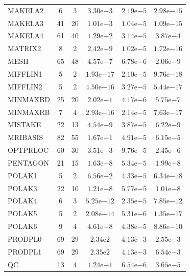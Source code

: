 \documentclass[11pt]{article}
\begin{document}
\begin{center}
\begin{longtable}{lccccc}
MAKELA2 & 6 & 3 & $3.30\mathrm{e}{-3}$ & $2.19\mathrm{e}{-5}$ & $2.98\mathrm{e}{-15}$ \\
MAKELA3 & 41 & 20 & $1.01\mathrm{e}{-3}$ & $1.04\mathrm{e}{-5}$ & $1.09\mathrm{e}{-15}$ \\
MAKELA4 & 61 & 40 & $1.29\mathrm{e}{-2}$ & $3.14\mathrm{e}{-5}$ & $3.87\mathrm{e}{-4}$ \\
MATRIX2 & 8 & 2 & $2.42\mathrm{e}{-9}$ & $1.02\mathrm{e}{-5}$ & $1.72\mathrm{e}{-16}$ \\
MESH & 65 & 48 & $4.57\mathrm{e}{-7}$ & $6.78\mathrm{e}{-6}$ & $2.06\mathrm{e}{-9}$ \\
MIFFLIN1 & 5 & 2 & $1.93\mathrm{e}{-17}$ & $2.10\mathrm{e}{-5}$ & $9.76\mathrm{e}{-18}$ \\
MIFFLIN2 & 5 & 2 & $4.50\mathrm{e}{-16}$ & $3.27\mathrm{e}{-5}$ & $5.44\mathrm{e}{-17}$ \\
MINMAXBD & 25 & 20 & $2.02\mathrm{e}{-1}$ & $4.17\mathrm{e}{-6}$ & $5.75\mathrm{e}{-7}$ \\
MINMAXRB & 7 & 4 & $2.93\mathrm{e}{-16}$ & $2.14\mathrm{e}{-5}$ & $7.63\mathrm{e}{-17}$ \\
MISTAKE & 22 & 13 & $4.54\mathrm{e}{-9}$ & $3.87\mathrm{e}{-5}$ & $6.22\mathrm{e}{-9}$ \\
MRIBASIS & 82 & 55 & $1.67\mathrm{e}{-1}$ & $4.91\mathrm{e}{-5}$ & $6.15\mathrm{e}{-5}$ \\
OPTPRLOC & 60 & 30 & $3.51\mathrm{e}{-3}$ & $9.76\mathrm{e}{-5}$ & $2.45\mathrm{e}{-6}$ \\
PENTAGON & 21 & 15 & $1.63\mathrm{e}{-8}$ & $5.34\mathrm{e}{-5}$ & $1.99\mathrm{e}{-8}$ \\
POLAK1 & 5 & 2 & $6.56\mathrm{e}{-2}$ & $4.33\mathrm{e}{-5}$ & $6.34\mathrm{e}{-18}$ \\
POLAK3 & 22 & 10 & $1.21\mathrm{e}{-8}$ & $5.77\mathrm{e}{-5}$ & $1.01\mathrm{e}{-8}$ \\
POLAK4 & 6 & 3 & $5.25\mathrm{e}{-12}$ & $2.35\mathrm{e}{-5}$ & $7.85\mathrm{e}{-12}$ \\
POLAK5 & 5 & 2 & $2.08\mathrm{e}{-14}$ & $5.31\mathrm{e}{-6}$ & $1.35\mathrm{e}{-17}$ \\
POLAK6 & 9 & 4 & $4.61\mathrm{e}{-8}$ & $4.38\mathrm{e}{-5}$ & $8.86\mathrm{e}{-10}$ \\
PRODPL0 & 69 & 29 & $2.34\mathrm{e}{2}$ & $4.13\mathrm{e}{-3}$ & $2.55\mathrm{e}{-3}$ \\
PRODPL1 & 69 & 29 & $2.35\mathrm{e}{2}$ & $4.13\mathrm{e}{-3}$ & $6.54\mathrm{e}{-3}$ \\
QC & 13 & 4 & $1.24\mathrm{e}{-1}$ & $6.54\mathrm{e}{-6}$ & $3.65\mathrm{e}{-5}$ \\

\end{longtable}
\end{center}
\end{document}
